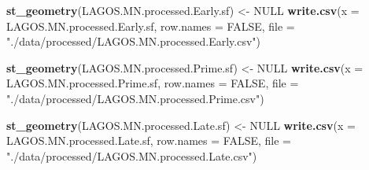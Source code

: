 \documentclass[]{article}
\newenvironment{Shaded}{\begin{snugshade}}{\end{snugshade}}
\newcommand{\DataTypeTok}[1]{\textcolor[rgb]{0.13,0.29,0.53}{#1}}
\newcommand{\KeywordTok}[1]{\textcolor[rgb]{0.13,0.29,0.53}{\textbf{#1}}}
\newcommand{\NormalTok}[1]{#1}
\newcommand{\OtherTok}[1]{\textcolor[rgb]{0.56,0.35,0.01}{#1}}
\newcommand{\StringTok}[1]{\textcolor[rgb]{0.31,0.60,0.02}{#1}}
\begin{document}
\begin{Shaded}
\begin{Highlighting}[]
\KeywordTok{st_geometry}\NormalTok{(LAGOS.MN.processed.Early.sf) <-}\StringTok{ }\OtherTok{NULL}
\KeywordTok{write.csv}\NormalTok{(}\DataTypeTok{x =}\NormalTok{  LAGOS.MN.processed.Early.sf, }\DataTypeTok{row.names =} \OtherTok{FALSE}\NormalTok{,}
          \DataTypeTok{file =}  \StringTok{"./data/processed/LAGOS.MN.processed.Early.csv"}\NormalTok{)}

\KeywordTok{st_geometry}\NormalTok{(LAGOS.MN.processed.Prime.sf) <-}\StringTok{ }\OtherTok{NULL}
\KeywordTok{write.csv}\NormalTok{(}\DataTypeTok{x =}\NormalTok{  LAGOS.MN.processed.Prime.sf, }\DataTypeTok{row.names =} \OtherTok{FALSE}\NormalTok{,}
          \DataTypeTok{file =}  \StringTok{"./data/processed/LAGOS.MN.processed.Prime.csv"}\NormalTok{)}

\KeywordTok{st_geometry}\NormalTok{(LAGOS.MN.processed.Late.sf) <-}\StringTok{ }\OtherTok{NULL}
\KeywordTok{write.csv}\NormalTok{(}\DataTypeTok{x =}\NormalTok{  LAGOS.MN.processed.Late.sf, }\DataTypeTok{row.names =} \OtherTok{FALSE}\NormalTok{,}
          \DataTypeTok{file =}  \StringTok{"./data/processed/LAGOS.MN.processed.Late.csv"}\NormalTok{)}
\end{Highlighting}
\end{Shaded}
\end{document}
